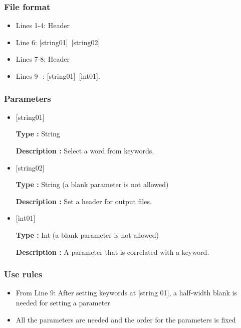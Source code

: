 \subsubsection{File format}
 \begin{itemize}
   \item  Lines 1-4:  Header
   \item  Line 6:  [string01]~[string02]
   \item  Lines 7-8:  Header
   \item  Lines 9- : [string01]~[int01].
  \end{itemize}
\subsubsection{Parameters}
\begin{itemize}
   \item  $[$string01$]$
   
   {\bf Type :} String

  {\bf Description :} Select a word from keywords.
   
   \item  $[$string02$]$
   
   {\bf Type :} String (a blank parameter is not allowed)

  {\bf Description :} Set a header for output files.

   \item  $[$int01$]$
   
   {\bf Type :} Int (a blank parameter is not allowed)

  {\bf Description :} A parameter that is correlated with a keyword.
  \end{itemize}

\subsubsection{Use rules}
\begin{itemize}
\item From Line 9: After setting keywords at [string 01], a half-width blank is needed for setting a parameter
\item All the parameters are needed and the order for the parameters is fixed
\end{itemize}

